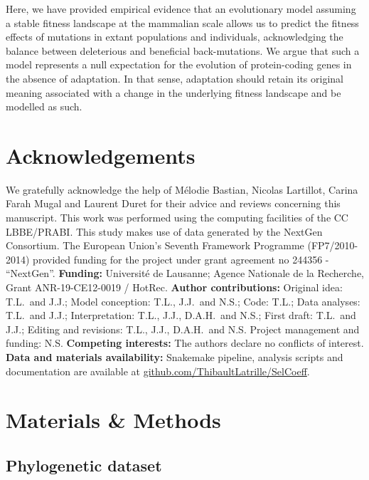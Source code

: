 \documentclass{article}
\begin{document}
    Here, we have provided empirical evidence that an evolutionary model assuming a stable fitness landscape at the mammalian scale allows us to predict the fitness effects of mutations in extant populations and individuals, acknowledging the balance between deleterious and beneficial back-mutations.
    We argue that such a model represents a null expectation for the evolution of protein-coding genes in the absence of adaptation.
    In that sense, adaptation should retain its original meaning associated with a change in the underlying fitness landscape and be modelled as such.

    \section*{Acknowledgements}
    \label{sec:acknowledgment}
    We gratefully acknowledge the help of Mélodie Bastian, Nicolas Lartillot, Carina Farah Mugal and Laurent Duret for their advice and reviews concerning this manuscript.
    This work was performed using the computing facilities of the CC LBBE/PRABI\@.
    This study makes use of data generated by the NextGen Consortium.
    The European Union’s Seventh Framework Programme (FP7/2010-2014) provided funding for the project under grant agreement no 244356 - “NextGen”.
    \textbf{Funding:}
    Université de Lausanne; Agence Nationale de la Recherche, Grant ANR-19-CE12-0019 / HotRec.
    \textbf{Author contributions:}
    Original idea: T.L.\ and J.J.;
    Model conception: T.L., J.J.\ and N.S.;
    Code: T.L.;
    Data analyses: T.L.\ and J.J.;
    Interpretation: T.L., J.J., D.A.H.\ and N.S.;
    First draft: T.L.\ and J.J.;
    Editing and revisions: T.L., J.J., D.A.H.\ and N.S.
    Project management and funding: N.S\@.
    \textbf{Competing interests:}
    The authors declare no conflicts of interest.
    \textbf{Data and materials availability:}
    Snakemake pipeline, analysis scripts and documentation are available at \href{https://github.com/ThibaultLatrille/SelCoeff}{github.com/ThibaultLatrille/SelCoeff}.


    \section{Materials \& Methods}
    \label{sec:methods}

    \subsection{Phylogenetic dataset}
\end{document}
